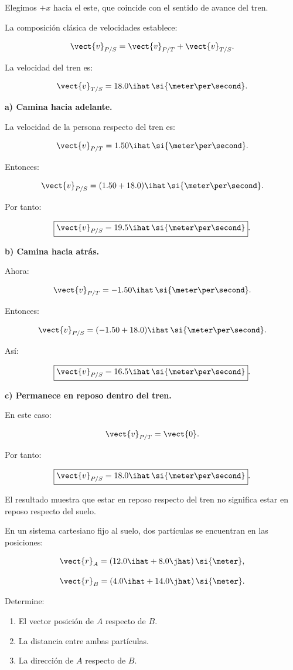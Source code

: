 \begin{explicacion}
Elegimos \(+x\) hacia el este, que coincide con
el sentido de avance del tren.

La composición clásica de velocidades establece:

\[
\vect{v}_{P/S}
=
\vect{v}_{P/T}
+
\vect{v}_{T/S}.
\]

La velocidad del tren es:

\[
\vect{v}_{T/S}
=
18.0\ihat\,
\si{\meter\per\second}.
\]

\textbf{a) Camina hacia adelante.}

La velocidad de la persona respecto del tren es:

\[
\vect{v}_{P/T}
=
1.50\ihat\,
\si{\meter\per\second}.
\]

Entonces:

\[
\vect{v}_{P/S}
=
(1.50+18.0)\ihat\,
\si{\meter\per\second}.
\]

Por tanto:

\[
\boxed{
\vect{v}_{P/S}
=
19.5\ihat\,
\si{\meter\per\second}
}.
\]

\textbf{b) Camina hacia atrás.}

Ahora:

\[
\vect{v}_{P/T}
=
-1.50\ihat\,
\si{\meter\per\second}.
\]

Entonces:

\[
\vect{v}_{P/S}
=
(-1.50+18.0)\ihat\,
\si{\meter\per\second}.
\]

Así:

\[
\boxed{
\vect{v}_{P/S}
=
16.5\ihat\,
\si{\meter\per\second}
}.
\]

\textbf{c) Permanece en reposo dentro del tren.}

En este caso:

\[
\vect{v}_{P/T}=\vect{0}.
\]

Por tanto:

\[
\boxed{
\vect{v}_{P/S}
=
18.0\ihat\,
\si{\meter\per\second}
}.
\]

El resultado muestra que estar en reposo respecto
del tren no significa estar en reposo respecto del suelo.
\end{explicacion}


\begin{ejercicio}
En un sistema cartesiano fijo al suelo, dos partículas
se encuentran en las posiciones:

\[
\vect{r}_A
=
(12.0\ihat+8.0\jhat)\,\si{\meter},
\]

\[
\vect{r}_B
=
(4.0\ihat+14.0\jhat)\,\si{\meter}.
\]

Determine:

\begin{enumerate}[label=\alph*)]
    \item El vector posición de \(A\) respecto de \(B\).
    \item La distancia entre ambas partículas.
    \item La dirección de \(A\) respecto de \(B\).
\end{enumerate}
\end{ejercicio}


